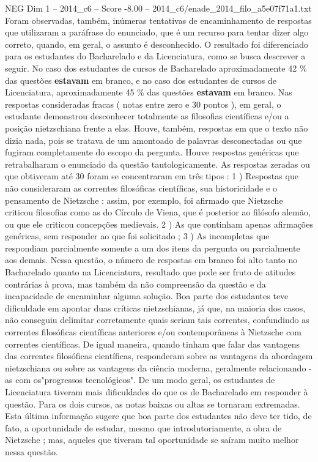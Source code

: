 \begin{textsample}{NEG Dim 1 – 2014\_c6 – Score -8.00 – 2014\_c6/enade\_2014\_filo\_a5e07f71a1.txt}
Foram observadas, também, inúmeras tentativas de encaminhamento de respostas que utilizaram a paráfrase do enunciado, que é um recurso para tentar dizer algo correto, quando, em geral, o assunto é desconhecido.
O resultado foi diferenciado para os estudantes do Bacharelado e da Licenciatura, como se busca descrever a seguir.
No caso dos estudantes de cursos de Bacharelado aproximadamente 42 \% das questões \textbf{estavam} em branco, e no caso dos estudantes de cursos de Licenciatura, aproximadamente 45 \% das questões \textbf{estavam} em branco.
Nas respostas consideradas fracas ( notas entre zero e 30 pontos ), em geral, o estudante demonstrou desconhecer totalmente as filosofias científicas e/ou a posição nietzschiana frente a elas.
Houve, também, respostas em que o texto não dizia nada, pois se tratava de um amontoado de palavras desconectadas ou que fugiram completamente do escopo da pergunta.
Houve respostas genéricas que retrabalharam o enunciado da questão tautologicamente.
As respostas zeradas ou que obtiveram até 30 foram se concentraram em três tipos : 1 ) Respostas que não consideraram as correntes filosóficas científicas, sua historicidade e o pensamento de Nietzsche : assim, por exemplo, foi afirmado que Nietzsche criticou filosofias como as do Círculo de Viena, que é posterior ao filósofo alemão, ou que ele criticou concepções medievais. 2 ) As que continham apenas afirmações genéricas, sem responder ao que foi solicitado ; 3 ) As incompletas que respondiam parcialmente somente a um dos itens da pergunta ou parcialmente aos demais.
Nessa questão, o número de respostas em branco foi alto tanto no Bacharelado quanto na Licenciatura, resultado que pode ser fruto de atitudes contrárias à prova, mas também da não compreensão da questão e da incapacidade de encaminhar alguma solução.
Boa parte dos estudantes teve dificuldade em apontar duas críticas nietzschianas, já que, na maioria dos casos, não conseguiu delimitar corretamente quais seriam tais correntes, confundindo as correntes filosóficas científicas anteriores e/ou contemporâneas à Nietzsche com correntes científicas.
De igual maneira, quando tinham que falar das vantagens das correntes filosóficas científicas, responderam sobre as vantagens da abordagem nietzschiana ou sobre as vantagens da ciência moderna, geralmente relacionando -as com os"progressos tecnológicos".
De um modo geral, os estudantes de Licenciatura tiveram mais dificuldades do que os de Bacharelado em responder à questão.
Para os dois cursos, as notas baixas ou altas se tornaram extremadas.
Esta última informação sugere que boa parte dos estudantes não deve ter tido, de fato, a oportunidade de estudar, mesmo que introdutoriamente, a obra de Nietzsche ; mas, aqueles que tiveram tal oportunidade se saíram muito melhor nessa questão.

\end{textsample}
